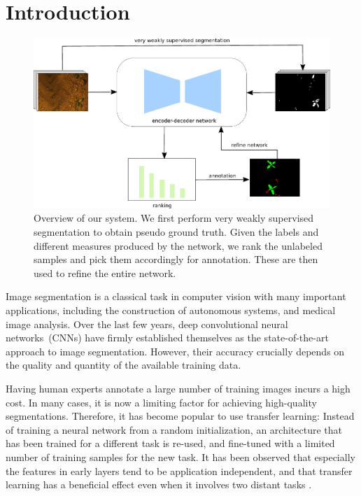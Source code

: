 \section{Introduction}
\label{sec:intro}

    \begin{figure}
    \centering
    \includegraphics[scale=0.9]{pics/output_system_overview.pdf}
   		\caption{Overview of our system. We first perform very weakly supervised segmentation to obtain pseudo ground truth. Given the labels and different measures produced by the network, we rank the unlabeled samples and pick them accordingly for annotation. These are then used to refine the entire network.}
		\label{fig:overview}    		
   \end{figure}

Image segmentation is a classical task in computer vision with many important applications, including the construction of autonomous systems, and medical image analysis. Over the last few years, deep convolutional neural networks~(CNNs) have firmly established themselves as the state-of-the-art approach to image segmentation. However, their accuracy crucially depends on the quality and quantity of the available training data.

Having human experts annotate a large number of training images incurs a high cost. In many cases, it is now a limiting factor for achieving high-quality segmentations. Therefore, it has become popular to use transfer learning: Instead of training a neural network from a random initialization, an architecture that has been trained for a different task is re-used, and fine-tuned with a limited number of training samples for the new task. It has been observed that especially the features in early layers tend to be application independent, and that transfer learning has a beneficial effect even when it involves two distant tasks \cite{yosinski:2014}.

